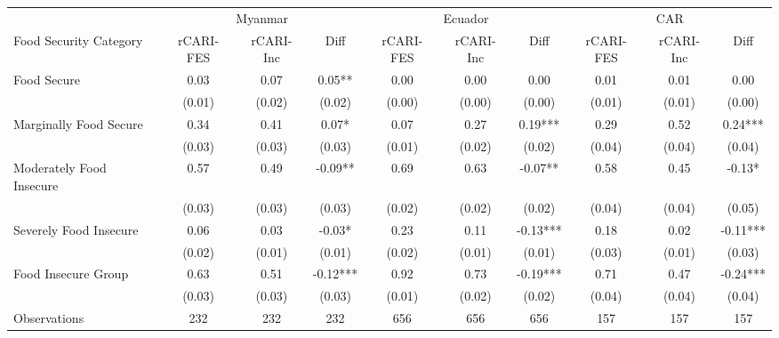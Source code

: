 \begin{tabular}{l*{9}c}
	\hline\hline
		\textbf{}                & \multicolumn{3}{c}{Myanmar}      & \multicolumn{3}{c}{Ecuador}      & \multicolumn{3}{c}{CAR}          \\
		Food Security Category   & rCARI-FES & rCARI-Inc & Diff     & rCARI-FES & rCARI-Inc & Diff     & rCARI-FES & rCARI-Inc & Diff     \\  \hline
		Food Secure              & 0.03      & 0.07      & 0.05**   & 0.00      & 0.00      & 0.00     & 0.01      & 0.01      & 0.00     \\
		& (0.01)    & (0.02)    & (0.02)   & (0.00)    & (0.00)    & (0.00)   & (0.01)    & (0.01)    & (0.00)   \\
		Marginally Food Secure   & 0.34      & 0.41      & 0.07*    & 0.07      & 0.27      & 0.19***  & 0.29      & 0.52      & 0.24***  \\
		& (0.03)    & (0.03)    & (0.03)   & (0.01)    & (0.02)    & (0.02)   & (0.04)    & (0.04)    & (0.04)   \\
		Moderately Food Insecure & 0.57      & 0.49      & -0.09**  & 0.69      & 0.63      & -0.07**  & 0.58      & 0.45      & -0.13*   \\
		& (0.03)    & (0.03)    & (0.03)   & (0.02)    & (0.02)    & (0.02)   & (0.04)    & (0.04)    & (0.05)   \\
		Severely Food Insecure   & 0.06      & 0.03      & -0.03*   & 0.23      & 0.11      & -0.13*** & 0.18      & 0.02      & -0.11*** \\
		& (0.02)    & (0.01)    & (0.01)   & (0.02)    & (0.01)    & (0.01)   & (0.03)    & (0.01)    & (0.03)   \\
		Food Insecure Group      & 0.63      & 0.51      & -0.12*** & 0.92      & 0.73      & -0.19*** & 0.71      & 0.47      & -0.24*** \\
		& (0.03)    & (0.03)    & (0.03)   & (0.01)    & (0.02)    & (0.02)   & (0.04)    & (0.04)    & (0.04)   \\  \hline
		Observations             & 232       & 232       & 232      & 656       & 656       & 656      & 157       & 157       & 157     \\
	\hline\hline
\end{tabular}